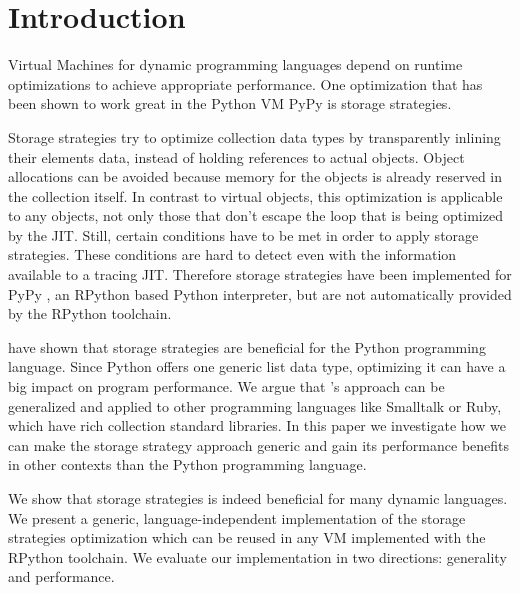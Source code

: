 \section{Introduction}

Virtual Machines for dynamic programming languages depend on runtime optimizations to achieve appropriate performance.
One optimization that has been shown to work great in the Python VM PyPy is storage strategies.

Storage strategies try to optimize collection data types by transparently inlining their elements data, instead of holding references to actual objects.
Object allocations can be avoided because memory for the objects is already reserved in the collection itself.
In contrast to virtual objects, this optimization is applicable to any objects, not only those that don't escape the loop that is being optimized by the JIT.
Still, certain conditions have to be met in order to apply storage strategies.
These conditions are hard to detect even with the information available to a tracing JIT.
Therefore storage strategies have been implemented for PyPy \cite{strategies}, an RPython based Python interpreter, but are not automatically provided by the RPython toolchain.

\citeauthor{strategies} have shown that storage strategies are beneficial for the Python programming language\cite{strategies}.
Since Python offers one generic list data type, optimizing it can have a big impact on program performance.
We argue that \citeauthor{strategies}'s approach can be generalized and applied to other programming languages like Smalltalk or Ruby, which have rich collection standard libraries.
In this paper we investigate how we can make the storage strategy approach generic and gain its performance benefits in other contexts than the Python programming language.

We show that storage strategies is indeed beneficial for many dynamic languages.
We present a generic, language-independent implementation of the storage strategies optimization which can be reused in any VM implemented with the RPython toolchain.
We evaluate our implementation in two directions: generality and performance.




